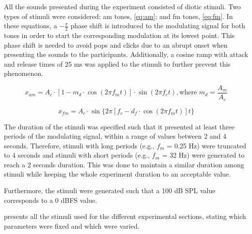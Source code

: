 \documentclass[../main.tex]{subfiles}
\begin{document}
All the sounds presented during the experiment consisted of diotic stimuli. Two
types of stimuli were considered: \gls{am} tones, \cref{eq:am}; and \gls{fm}
tones, \cref{eq:fm}. In these equations, a $-\frac{\pi}{2}$ phase shift is
introduced to the modulating signal for both tones in order to start the
corresponding modulation at its lowest point. This phase shift is needed to
avoid pops and clicks due to an abrupt onset when presenting the sounds to the
participants. Additionally, a cosine ramp with attack and release times of 25 ms
was applied to the stimuli to further prevent this phenomenon.

\begin{equation}
  x_{am} = A_c \cdot [1 - m_d \cdot \cos(2 \pi f_m t)] \cdot \sin(2 \pi f_c t),
 \text{where } m_d = \frac{A_m}{A_c}
  \label{eq:am}
\end{equation}

\begin{equation}
  x_{fm} = A_c \cdot \sin \{2 \pi [f_c - d_f \cdot \cos(2 \pi f_m t)] t \}
  \label{eq:fm}
\end{equation}

The duration of the stimuli was specified such that it presented at least three
periods of the modulating signal, within a range of values between 2 and 4
seconds. Therefore, stimuli with long periods (e.g., $f_m$ = 0.25 Hz) were
truncated to 4 seconds and stimuli with short periods (e.g., $f_m$ = 32 Hz) were
generated to reach a 2 seconds duration. This was done to maintain a similar
duration among stimuli while keeping the whole experiment duration to an
acceptable value.

Furthermore, the stimuli were generated such that a 100 dB SPL value
corresponds to a 0 dBFS value.

 presents all the stimuli used for the different
experimental sections, stating which parameters were fixed and which were varied.
\end{document}
